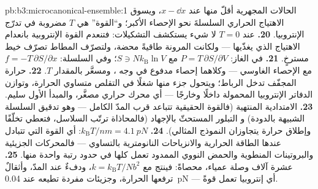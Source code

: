 \begin{solution}{pb:b3:microcanonical-ensemble:1}
الحالات المجهرية أقلّ منها عند $x - \dd x$، ويسوق الاهتياج الحراري
السلسلةَ نحو الإحصاء الأكبر؛ و``القوة'' هي
$T$ مضروبة في تدرّج الإنتروبيا.
\textbf{20.} عند $T = 0$ لا شيء يستكشف التشكيلات: فتنعدم
القوة الإنتروبية بانعدام الاهتياج الذي يغذّيها ---
ولكانت المرونة طاقيةً محضة، ولتصرّف المطاط
تصرّف خيط مسترخٍ.
\textbf{21.} في الغاز: $P = T\,\partial S/\partial V$ مع $S \ni
Nk_{\text{B}}\ln V$؛ وفي السلسلة: $f = -T\,\partial S/\partial x$ مع
الإحصاء الغاوسي --- وكلاهما إحصاء مدفوع في وجه
، ومسعَّر بالمقدار $T$.
\textbf{22.} حرارة المجفّف تدخل الرباط؛ ويتحول جزء منها
شغلًا في التقلص متساوي الحرارة، وتوازن الدفاتر الإنتروبيا
المحمولة داخلًا وخارجًا --- أي محرك حراري مصغَّر، والمبدأ الأول
سليم.
\textbf{23.} الامتدادية المنتهية (فالقوة الحقيقية تتباعد قرب
المدّ الكامل --- وهو تدقيق السلسلة الشبيهة بالدودة) و
التبلور المستحثّ بالإجهاد (فالمحاذاة ترتّب السلاسل،
فتعطي تخلّفًا وإطلاق حرارة يتجاوزان النموذج المثالي).
\textbf{24.} $k_{\text{B}}T/\unit{nm} = \qty{4.1}{pN}$: أي
القوة التي تتبادل عندها الطاقة الحرارية والانزياحات النانومترية
بالتساوي --- فالمحركات الجزيئية والبروتينات المنطوية والحمض النووي
الممدود تعمل كلها في حدود رتبة واحدة منها.
\textbf{25.} عشرة آلاف وصلة عمياء، محصاةً: فينتج  مع
$k = k_{\text{B}}T/Nb^2$، ودفءٌ عند المدّ، وأثقالٌ ترفعها
الحرارة، وجزيئات مفردة تطيعه عند \qty{0.04}{pN} ---
أي إنتروبيا تعمل قوةً.
\end{solution}
